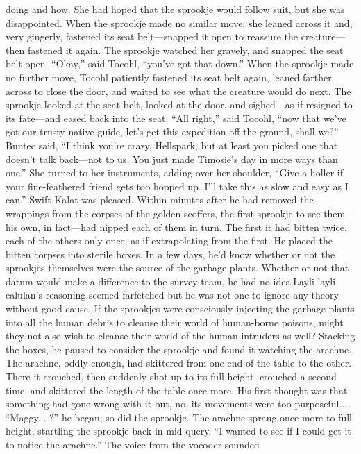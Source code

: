 \documentclass[9pt]{article}
\begin{document}
doing and how. She had hoped that the sprookje would follow suit, but she was disappointed. When the
sprookje made no similar move, she leaned across it and, very gingerly, fastened its seat belt—snapped it
open to reassure the creature—then fastened it again.
The sprookje watched her gravely, and snapped the seat belt open. “Okay,” said Tocohl, “you’ve
got that down.”
When the sprookje made no further move, Tocohl patiently fastened its seat belt again, leaned farther
across to close the door, and waited to see what the creature would do next. The sprookje looked at the
seat belt, looked at the door, and sighed—as if resigned to its fate—and eased back into the seat.
“All right,” said Tocohl, “now that we’ve got our trusty native guide, let’s get this expedition off the
ground, shall we?”
Buntec said, “I think you’re crazy, Hellspark, but at least you picked one that doesn’t talk back—not
to us. You just made Timosie’s day in more ways than one.” She turned to her instruments, adding over
her shoulder, “Give a holler if your fine-feathered friend gets too hopped up. I’ll take this as slow and
easy as I can.”
Swift-Kalat was pleased. Within minutes after he had removed the wrappings from the corpses of the
golden scoffers, the first sprookje to see them—his own, in fact—had nipped each of them in turn. The
first it had bitten twice, each of the others only once, as if extrapolating from the first.
He placed the bitten corpses into sterile boxes. In a few days, he’d know whether or not the
sprookjes themselves were the source of the garbage plants. Whether or not that datum would make a
difference to the survey team, he had no idea.Layli-layli calulan’s reasoning seemed farfetched but he was not one to ignore any theory without
good cause. If the sprookjes were consciously injecting the garbage plants into all the human debris to
cleanse their world of human-borne poisons, might they not also wish to cleanse their world of the human
intruders as well?
Stacking the boxes, he paused to consider the sprookje and found it watching the arachne. The
arachne, oddly enough, had skittered from one end of the table to the other. There it crouched, then
suddenly shot up to its full height, crouched a second time, and skittered the length of the table once
more. His first thought was that something had gone wrong with it but, no, its movements were too
purposeful...
“Maggy... ?” he began; so did the sprookje.
The arachne sprang once more to full height, startling the sprookje back in mid-query.
“I wanted to see if I could get it to notice the arachne.” The voice from the vocoder sounded
\end{document}
